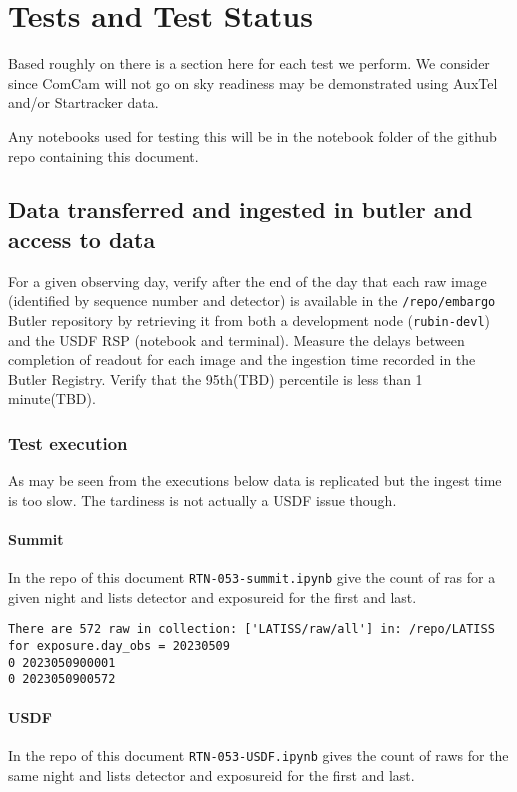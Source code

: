 \section{Tests and Test Status} \label{sec:testing}
Based roughly on  there is a section here for each test we perform.
We consider since ComCam will not go on sky readiness may be demonstrated using AuxTel and/or Startracker data.

Any notebooks used for testing this will be in the notebook folder of the github repo containing this document.

\subsection{Data transferred and ingested in butler and access to data}
For a given observing day, verify after the end of the day that each raw image (identified by sequence number and detector) is available in the \texttt{/repo/embargo} Butler repository by retrieving it from both a development node (\texttt{rubin-devl}) and the USDF RSP (notebook and terminal).
Measure the delays between completion of readout for each image and the ingestion time recorded in the Butler Registry.
Verify that the 95th(TBD) percentile is less than 1 minute(TBD).

\subsubsection{Test execution}
As may be seen from the executions below data is replicated but the ingest time is too slow.
The tardiness is not actually a USDF issue though.
\paragraph{Summit}
In the repo of this document \texttt{RTN-053-summit.ipynb} give the count of ras for a given night and lists detector and exposureid for the first and last.
\begin{verbatim}
There are 572 raw in collection: ['LATISS/raw/all'] in: /repo/LATISS for exposure.day_obs = 20230509
0 2023050900001
0 2023050900572
\end{verbatim}

\paragraph{USDF}
In the repo of this document \texttt{RTN-053-USDF.ipynb} gives the count of raws for the same night and lists detector and exposureid for the first and last.

